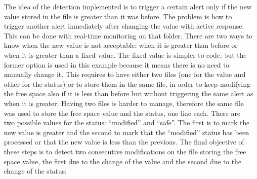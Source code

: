 \linej
The idea of the detection implemented is to trigger a certain alert only if the new value stored in the file is greater than it was before.
The problem is how to trigger another alert inmediately after changing the value with active response.
This can be done with real-time monitoring on that folder.
\linej
There are two ways to know when the new value is not acceptable: when it is greater than before or when it is greater than a fixed value.
The fixed value is simpler to code, but the former option is used in this example because it means there is no need to manually change it.
\linej
This requires to have either two files (one for the value and other for the status) or to store them in the same file, in order to keep modifying the free space also if it is less than before but without triggering the same alert as when it is greater.
Having two files is harder to manage, therefore the same file was used to store the free space value and the status, one line each.
\linej
There are two possible values for the status: ``modified'' and ``safe''.
The first is to mark the new value is greater and the second to mark that the ``modified'' status has been processed or that the new value is less than the previous.
\linej
\linej
The final objective of these steps is to detect two consecutive modifications on the file storing the free space value, the first due to the change of the value and the second due to the change of the status:
